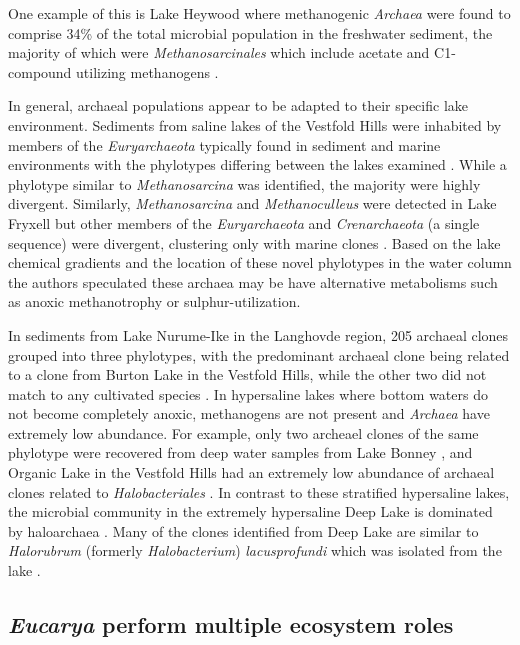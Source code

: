 One example of this is Lake Heywood where methanogenic \emph{Archaea} were found to comprise 34\% of the total microbial population in the freshwater sediment, 
the majority of which were \emph{Methanosarcinales} which include acetate and C1-compound utilizing methanogens \cite{Purdy2003}. 

In general, archaeal populations appear to be adapted to their specific lake environment.
Sediments from saline lakes of the Vestfold Hills were inhabited by members of the \emph{Euryarchaeota} typically found in sediment and marine environments 
with the phylotypes differing between the lakes examined \cite{Bowman2000a}. 
While a phylotype similar to \emph{Methanosarcina} was identified, the majority were highly divergent. 
Similarly, \emph{Methanosarcina} and \emph{Methanoculleus} were detected in Lake Fryxell but other members of the \emph{Euryarchaeota} and \emph{Crenarchaeota} (a single sequence) were divergent, 
clustering only with marine clones \cite{Karr2006}. 
Based on the lake chemical gradients and the location of these novel phylotypes in the water column the authors speculated these archaea may be have alternative metabolisms such as anoxic methanotrophy or sulphur-utilization. 

In sediments from Lake Nurume-Ike in the Langhovde region, 205 archaeal clones grouped into three phylotypes, 
with the predominant archaeal clone being related to a clone from Burton Lake in the Vestfold Hills, while the other two did not match to any cultivated species \cite{Kurosawa2010}. 
In hypersaline lakes where bottom waters do not become completely anoxic, methanogens are not present and \emph{Archaea} have extremely low abundance. 
For example, only two archeael clones of the same phylotype were recovered from deep water samples from Lake Bonney \cite{Glatz2006}, 
and Organic Lake in the Vestfold Hills had an extremely low abundance of archaeal clones related to \emph{Halobacteriales} \cite{Bowman2000}. 
In contrast to these stratified hypersaline lakes, the microbial community in the extremely hypersaline Deep Lake is dominated by haloarchaea \cite{Bowman2000}. 
Many of the clones identified from Deep Lake are similar to \emph{Halorubrum} (formerly \emph{Halobacterium}) \emph{lacusprofundi} which was isolated from the lake \cite{Franzmann1988}. 

\subsection{\emph{Eucarya} perform multiple ecosystem roles}


